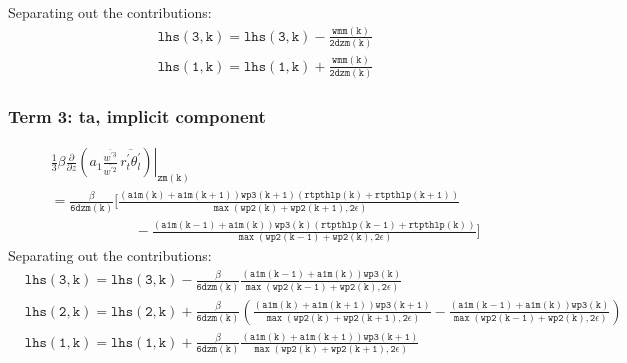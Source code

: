 \documentclass[11pt,fleqn]{article}
\newcommand{\ptlder}[2]{\frac{\partial #1}{\partial #2}}
\begin{document}
Separating out the contributions:
%
\begin{equation}
\begin{split}
& \mathtt{ lhs(3,k) = lhs(3,k) - \frac{wmm(k)}{2 dzm(k)} } \\
& \mathtt{ lhs(1,k) = lhs(1,k) + \frac{wmm(k)}{2 dzm(k)} }
\end{split}
\end{equation}

\subsubsection{Term 3:  ta, implicit component}

\begin{equation}
\begin{split}
& \left.
  \frac{1}{3} \beta
   \ptlder{}{z}
     \left( 
       a_1
       \frac{\overline{w^{'3}}}{\overline{w^{'2}}} \,
       \overline{r_t^{'}\theta_l^{'}}
     \right)
   \right|_{\mathtt{zm(k)}} \\
&= \mathtt{
    \frac{\beta}{6 dzm(k)}
    \bigg[ \frac{\left(a1m(k)+a1m(k+1)\right) wp3(k+1) \left(rtpthlp(k)+rtpthlp(k+1) \right)}
                {\max\left(wp2(k)+wp2(k+1),2\epsilon\right)} } \\
&  \mathtt{ \quad \quad \quad \quad \quad \quad
          -\frac{\left(a1m(k-1)+a1m(k)\right) wp3(k) \left(rtpthlp(k-1)+rtpthlp(k) \right)}
                {\max\left(wp2(k-1)+wp2(k),2\epsilon\right)}
    \bigg]
    }
\end{split}
\end{equation}
%
Separating out the contributions:
%
\begin{equation}
\begin{split}
& \mathtt{ 
   lhs(3,k) = lhs(3,k) - \frac{\beta}{6 dzm(k)}
                 \frac{\left(a1m(k-1)+a1m(k)\right) wp3(k)}
                      {\max\left(wp2(k-1)+wp2(k),2\epsilon\right)}
  } \\
& \mathtt{
   lhs(2,k) = lhs(2,k) + \frac{\beta}{6 dzm(k)}
                 \left(
                   \frac{\left(a1m(k)+a1m(k+1)\right) wp3(k+1)}
                        {\max\left(wp2(k)+wp2(k+1),2\epsilon\right)}
                  -\frac{\left(a1m(k-1)+a1m(k)\right) wp3(k)}
                        {\max\left(wp2(k-1)+wp2(k),2\epsilon\right)}
                 \right)
  } \\
& \mathtt{
   lhs(1,k) = lhs(1,k) + \frac{\beta}{6 dzm(k)}
                 \frac{\left(a1m(k)+a1m(k+1)\right) wp3(k+1)}
                      {\max\left(wp2(k)+wp2(k+1),2\epsilon\right)}
  }
\end{split}
\end{equation}
\end{document}
